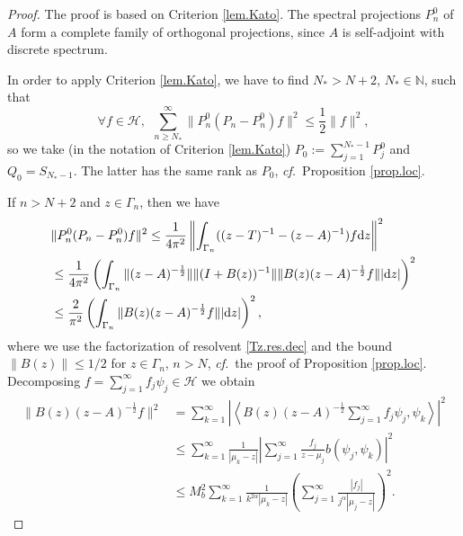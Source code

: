 \begin{proof}
The proof is based on Criterion \ref{lem.Kato}. The spectral projections $P_n^0$ of $A$ form a complete family of orthogonal projections, since $A$ is self-adjoint with discrete spectrum. 

In order to apply Criterion \ref{lem.Kato}, we have to find $N_* > N+2$, $N_* \in {\mathbb{N}}$, such that
\begin{equation*}
\forall f \in {{\mathcal{H}}}, \ \ \sum_{n \geq N_*}^{\infty} \|P_n^0(P_n-P_n^0)f\|^2 \leq \frac{1}{2} \|f\|^2,
\end{equation*}
so we take (in the notation of Criterion \ref{lem.Kato}) $P_0:= \sum_{j=1}^{N_*-1} P_j^0$ and $Q_0= S_{N_*-1}$. The latter has the same rank as $P_0$, {\emph{cf.}}~Proposition \ref{prop.loc}.

If $n > N + 2$ and $z\in \Gamma_n$, then we have
\begin{equation}
\label{Pn.est.1}
\begin{aligned}
&\|P_n^0(P_n-P_n^0)f\|^2 \leq \frac{1}{4\pi^2} \left\|\int_{\Gamma_n} ((z-T)^{-1} - (z-A)^{-1} )f {{{\rm d}}} z \right\|^2 
\\
& \leq 
\frac{1}{4\pi^2}
\left( \int_{\Gamma_n} \|(z-A)^{-\frac{1}{2}} \| \|(I+B(z))^{-1}\| \|B(z)(z-A)^{-\frac{1}{2}} f\| |{{{\rm d}}} z | \right)^2
\\
& \leq \frac{2}{\pi^2} \left( \int_{\Gamma_n} \|B(z)(z-A)^{-\frac{1}{2}} f\| |{{{\rm d}}} z| \right)^2,
\end{aligned}
\end{equation}
where we use the factorization of resolvent \eqref{Tz.res.dec} and the bound $\|B(z)\| \leq 1/2$ for $z \in \Gamma_n$, $n>N$, {\emph{cf.}}~the proof of Proposition \ref{prop.loc}.
Decomposing $f = \sum_{j=1}^{\infty} f_j \psi_j \in {{\mathcal{H}}}$ we obtain
\begin{equation*}
\begin{aligned}
 \|B(z)(z-A)^{-\frac{1}{2}} f\|^2 &= 
\sum_{k=1}^{\infty} 
\left| 
\left\langle 
B(z) (z-A)^{-\frac{1}{2}} 
\sum_{j=1}^{\infty}f_j \psi_j,
\psi_k
\right\rangle
\right|^2
\\
& \leq 
\sum_{k=1}^{\infty} \frac{1}{|\mu_k-z|} 
\left| 
\sum_{j=1}^{\infty} \frac{f_j}{z-\mu_j} b(\psi_j,\psi_k) \right|^2
\\
&
\leq  M_b^2
\sum_{k=1}^{\infty} \frac{1}{k^{2\alpha}|\mu_k-z|} 
\left(
\sum_{j=1}^{\infty} \frac{|f_j|}{j^{\alpha}|\mu_j-z|}  
\right)^2.
\end{aligned}
\end{equation*}

\end{proof}
